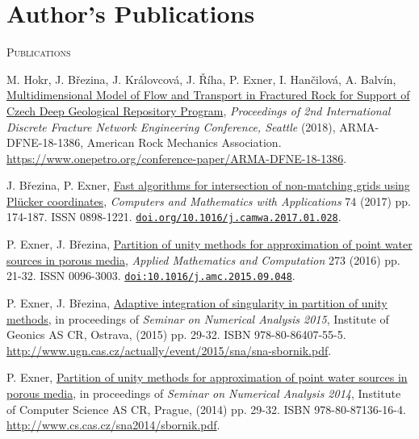 \documentclass[bibliography=totocnumbered,dvipsnames,FM,Dis,EN]{tulthesis}
\begin{document}
\chapter*{Author's Publications} \label{chap:publications}
% 
{\large\textsc{Publications}}
\begin{itemize}[label={}, leftmargin=*]

{\small
\item
M. Hokr, J. B{\v r}ezina, J. Kr{\' a}lovcov{\' a}, J. {\v R}{\' i}ha, P. Exner, I. Han{\v c}ilov{\' a}, A. Balv{\' i}n,
\href{https://www.onepetro.org/conference-paper/ARMA-DFNE-18-1386}
{Multidimensional Model of Flow and Transport in Fractured Rock for Support of Czech Deep Geological Repository Program},
\emph{Proceedings of 2nd International Discrete Fracture Network Engineering Conference, Seattle} (2018), ARMA-DFNE-18-1386,
American Rock Mechanics Association.\\
\url{https://www.onepetro.org/conference-paper/ARMA-DFNE-18-1386}.

\item
J. B{\v r}ezina, P. Exner, \href{http://www.sciencedirect.com/science/article/pii/S0898122117300792}{Fast algorithms for intersection of non-matching grids using Plücker coordinates},
\emph{Computers and Mathematics with Applications} 74 (2017) pp. 174-187. ISSN 0898-1221.
\href{https://doi.org/10.1016/j.camwa.2017.01.028}{\texttt{doi.org/10.1016/j.camwa.2017.01.028}}.

\item
P. Exner, J. B{\v r}ezina, \href{http://www.sciencedirect.com/science/article/pii/S0096300315012862}{Partition of unity methods for approximation of point water sources in porous media},
\emph{Applied Mathematics and Computation} 273 (2016) pp. 21-32. ISSN 0096-3003.
\href{http://dx.doi.org/10.1016/j.amc.2015.09.048}{\texttt{doi:10.1016/j.amc.2015.09.048}}.

\item
P. Exner, J. B{\v r}ezina, \href{http://www.ugn.cas.cz/actually/event/2015/sna/sna-sbornik.pdf}{Adaptive integration of singularity in partition of unity methods},
in proceedings of \emph{Seminar on Numerical Analysis 2015}, Institute of Geonics AS CR, Ostrava, (2015) pp. 29-32. ISBN 978-80-86407-55-5. \\
\url{http://www.ugn.cas.cz/actually/event/2015/sna/sna-sbornik.pdf}.

\item
P. Exner, \href{http://www.cs.cas.cz/sna2014/sbornik.pdf}{Partition of unity methods for approximation of point water sources in porous media},
in proceedings of \emph{Seminar on Numerical Analysis 2014}, Institute of Computer Science AS CR, Prague, (2014) pp. 29-32. ISBN 978-80-87136-16-4.\\
\url{http://www.cs.cas.cz/sna2014/sbornik.pdf}.
}
\end{itemize}
\end{document}
